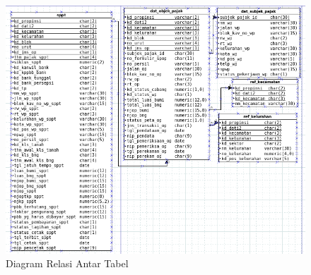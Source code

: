 \begin{figure}[H]
	\centering
	\includegraphics[width=1\textwidth]{./resources/db-diagram}
	\caption{Diagram Relasi Antar Tabel}
	\label{fig:db-diagram}
\end{figure}